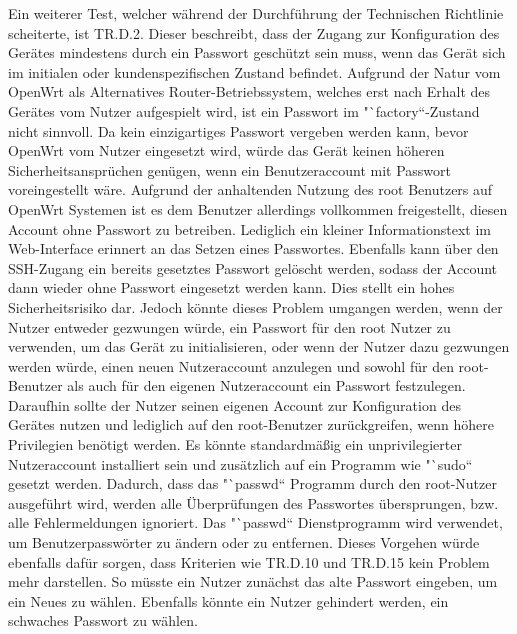 \documentclass[a4paper]{book}
\begin{document}
\begin{large}
\begin{onehalfspace}
\indent Ein weiterer Test, welcher während der Durchführung der Technischen Richtlinie scheiterte, ist TR.D.2. Dieser beschreibt, dass der Zugang zur Konfiguration des Gerätes mindestens durch ein Passwort geschützt sein muss, wenn das Gerät sich im initialen oder kundenspezifischen Zustand befindet. Aufgrund der Natur vom OpenWrt als Alternatives Router-Betriebssystem, welches erst nach Erhalt des Gerätes vom Nutzer aufgespielt wird, ist ein Passwort im "`factory“-Zustand nicht sinnvoll. Da kein einzigartiges Passwort vergeben werden kann, bevor OpenWrt vom Nutzer eingesetzt wird, würde das Gerät keinen höheren Sicherheitsansprüchen genügen, wenn ein Benutzeraccount mit Passwort voreingestellt wäre. Aufgrund der anhaltenden Nutzung des root Benutzers auf OpenWrt Systemen ist es dem Benutzer allerdings vollkommen freigestellt, diesen Account ohne Passwort zu betreiben. Lediglich ein kleiner Informationstext im Web-Interface erinnert an das Setzen eines Passwortes. Ebenfalls kann über den SSH-Zugang ein bereits gesetztes Passwort gelöscht werden, sodass der Account dann wieder ohne Passwort eingesetzt werden kann. Dies stellt ein hohes Sicherheitsrisiko dar. Jedoch könnte dieses Problem umgangen werden, wenn der Nutzer entweder gezwungen würde, ein Passwort für den root Nutzer zu verwenden, um das Gerät zu initialisieren, oder wenn der Nutzer dazu gezwungen werden würde, einen neuen Nutzeraccount anzulegen und sowohl für den root-Benutzer als auch für den eigenen Nutzeraccount ein Passwort festzulegen. Daraufhin sollte der Nutzer seinen eigenen Account zur Konfiguration des Gerätes nutzen und lediglich auf den root-Benutzer zurückgreifen, wenn höhere Privilegien benötigt werden. Es könnte standardmäßig ein unprivilegierter Nutzeraccount installiert sein und zusätzlich auf ein Programm wie "`sudo“ gesetzt werden. Dadurch, dass das "`passwd“ Programm durch den root-Nutzer ausgeführt wird, werden alle Überprüfungen des Passwortes übersprungen, bzw. alle Fehlermeldungen ignoriert. Das "`passwd“ Dienstprogramm wird verwendet, um Benutzerpasswörter zu ändern oder zu entfernen. Dieses Vorgehen würde ebenfalls dafür sorgen, dass Kriterien wie TR.D.10 und TR.D.15 kein Problem mehr darstellen. So müsste ein Nutzer zunächst das alte Passwort eingeben, um ein Neues zu wählen. Ebenfalls könnte ein Nutzer gehindert werden, ein schwaches Passwort zu wählen. \\ \indent

\end{onehalfspace}
\end{large}
\end{document}
